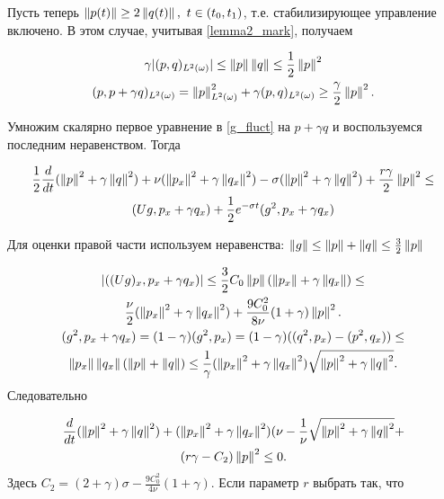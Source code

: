 Пусть теперь $\left\lVert p(t)\right\rVert \ge 2 \left\lVert q(t)\right\rVert, \ t \in (t_0, t_1)$, т.е.
стабилизирующее управление включено. В этом случае, учитывая
\eqref{lemma2_mark}, получаем

\begin{gather*}
    \gamma |(p, q)_{L^2(\omega)}| \le \left\lVert p\right\rVert \left\lVert q\right\rVert \le \frac{1}{2}
    \left\lVert p\right\rVert^2\\
    (p, p + \gamma q)_{L^2(\omega)} = \left\lVert p\right\rVert^2_{L^2(\omega)} + \gamma(p,
    q)_{L^2(\omega)} \ge \frac{\gamma}{2}\left\lVert p\right\rVert^2.
\end{gather*}

Умножим скалярно первое уравнение в \eqref{g_fluct} на $p + \gamma q$ и
воспользуемся последним неравенством. Тогда

\begin{gather*}
    \frac{1}{2} \frac{d}{dt} (\left\lVert p\right\rVert^2 + \gamma \left\lVert q\right\rVert^2) + \nu
    (\left\lVert p_x\right\rVert^2 + \gamma \left\lVert q_x\right\rVert^2) - \sigma (\left\lVert p\right\rVert^2 + \gamma
    \left\lVert q\right\rVert^2) + \frac{r\gamma}{2} \left\lVert p\right\rVert^2 \le \\
    (Ug, p_x + \gamma q_x) +
    \frac{1}{2} e^{-\sigma t}(g^2, p_x + \gamma q_x)
\end{gather*}

Для оценки правой части используем неравенства: $\left\lVert g\right\rVert \le \left\lVert p\right\rVert + 
\left\lVert q\right\rVert \le \frac{3}{2} \left\lVert p\right\rVert$

\begin{gather*}
    |((U g)_x, p_x + \gamma q_x)| \le \frac{3}{2} C_0 \left\lVert p\right\rVert(\left\lVert p_x\right\rVert +
    \gamma \left\lVert q_x\right\rVert) \le \\
    \frac{\nu}{2} (\left\lVert p_x\right\rVert^2 + \gamma \left\lVert q_x\right\rVert^2) +
    \frac{9C_0^2}{8\nu}(1 + \gamma)\left\lVert p\right\rVert^2.\\
    (g^2, p_x + \gamma q_x) = (1 - \gamma)(g^2, p_x) = (1 - \gamma)((q^2, p_x) -
    (p^2, q_x)) \le \\
    \left\lVert p_x\right\rVert\left\lVert q_x\right\rVert(\left\lVert p\right\rVert + \left\lVert q\right\rVert) \le \frac{1}{\gamma}(\left\lVert p_x\right\rVert^2
    + \gamma \left\lVert q_x\right\rVert^2)\sqrt{\left\lVert p\right\rVert^2 + \gamma \left\lVert q\right\rVert^2}.
\end{gather*}
Следовательно

\begin{gather*}
    \frac{d}{dt}(\left\lVert p\right\rVert^2 + \gamma \left\lVert q\right\rVert^2) + (\left\lVert p_x\right\rVert^2 + \gamma
    \left\lVert q_x\right\rVert^2)(\nu - \frac{1}{\nu}\sqrt{\left\lVert p\right\rVert^2 + \gamma \left\lVert q\right\rVert^2} + \\
    (r \gamma - C_2)\left\lVert p\right\rVert^2 \le 0.
\end{gather*}
Здесь $C_2 = (2 + \gamma)\sigma - \frac{9C_0^2}{4\nu}(1 + \gamma)$. Если
параметр $r$ выбрать так, что 

